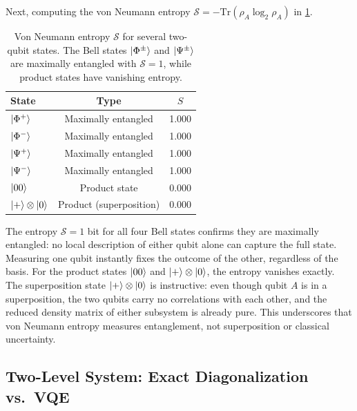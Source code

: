 Next, computing the von Neumann entropy $\mathcal{S}=-\text{Tr}\left(\rho_A\log_2\rho_A\right)$ in \cref{tab:entanglement-entropy-states}. 
\begin{table}[!htbp]
\centering
\begin{tabular}{lcc}
\hline
State & Type & $S$ \\
\hline
$\left| \Phi^{+} \right\rangle$ & Maximally entangled & 1.000 \\
$\left| \Phi^{-} \right\rangle$ & Maximally entangled & 1.000 \\
$\left| \Psi^{+} \right\rangle$ & Maximally entangled & 1.000 \\
$\left| \Psi^{-} \right\rangle$ & Maximally entangled & 1.000 \\
$\left| 00 \right\rangle$ & Product state & 0.000 \\
$\left| + \right\rangle\otimes\left| 0 \right\rangle$ & Product (superposition) & 0.000 \\
\hline
\end{tabular}
\caption{Von Neumann entropy $\mathcal{S}$ for several two-qubit states. The Bell states $\left| \Phi^{\pm} \right\rangle$ and $\left| \Psi^{\pm} \right\rangle$ are maximally entangled with $\mathcal{S}=1$, while product states have vanishing entropy.}
\label{tab:entanglement-entropy-states}
\end{table}

The entropy $\mathcal{S}=1$ bit for all four Bell states confirms they are maximally entangled: no local description of either qubit alone can capture the full state. Measuring one qubit instantly fixes the outcome of the other, regardless of the basis. For the product states $\left| 00 \right\rangle$ and $\left| + \right\rangle\otimes\left| 0 \right\rangle$, the entropy vanishes exactly. The superposition state $\left| + \right\rangle\otimes\left| 0 \right\rangle$ is instructive: even though qubit $A$ is in a superposition, the two qubits carry no correlations with each other, and the reduced density matrix of either subsystem is already pure. This underscores that von Neumann entropy measures entanglement, not superposition or classical uncertainty.

\subsection{Two-Level System: Exact Diagonalization vs.\ VQE}
\label{subsec:two-level-vqe}

